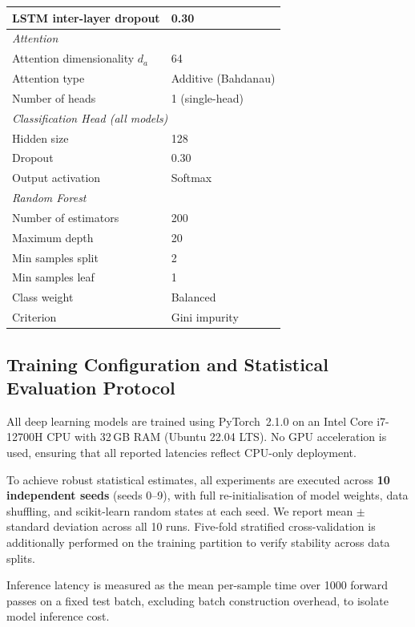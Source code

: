 \documentclass[conference]{IEEEtran}
\begin{document}
\begin{table}[htbp]
\begin{tabular}{lp{4.2cm}}
LSTM inter-layer dropout        & 0.30 \\
\midrule
\multicolumn{2}{l}{\textit{Attention}} \\
Attention dimensionality $d_a$  & 64 \\
Attention type                  & Additive (Bahdanau) \\
Number of heads                 & 1 (single-head) \\
\midrule
\multicolumn{2}{l}{\textit{Classification Head (all models)}} \\
Hidden size                     & 128 \\
Dropout                         & 0.30 \\
Output activation               & Softmax \\
\midrule
\multicolumn{2}{l}{\textit{Random Forest}} \\
Number of estimators            & 200 \\
Maximum depth                   & 20 \\
Min samples split               & 2 \\
Min samples leaf                & 1 \\
Class weight                    & Balanced \\
Criterion                       & Gini impurity \\
\bottomrule
\end{tabular}
\end{table}

\subsection{Training Configuration and Statistical Evaluation Protocol}
\label{ssec:training}

All deep learning models are trained using PyTorch~2.1.0 on an Intel Core
i7-12700H CPU with 32\,GB RAM (Ubuntu 22.04 LTS). No GPU acceleration is used,
ensuring that all reported latencies reflect CPU-only deployment.

To achieve robust statistical estimates, all experiments are executed across
\textbf{10 independent seeds} (seeds 0--9), with full re-initialisation of
model weights, data shuffling, and scikit-learn random states at each seed.
We report mean $\pm$ standard deviation across all 10 runs. Five-fold stratified
cross-validation is additionally performed on the training partition to verify
stability across data splits.

Inference latency is measured as the mean per-sample time over 1000 forward
passes on a fixed test batch, excluding batch construction overhead, to isolate
model inference cost.
\end{document}
